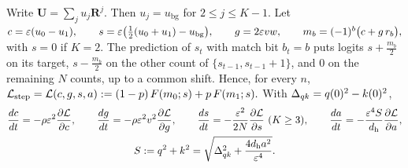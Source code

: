 \begin{lemma}
\label{lem:J-reduce}
Write $\mathbf U=\sum_ju_j\mathbf R^j$. Then $u_j=u_{\mathrm{bg}}$ for $2\le j\le K-1$. Let
 $c=\initscale(u_0-u_1),\qquad s=\initscale\bigl(\tfrac{1}{2}(u_0+u_1)-u_{\mathrm{bg}}\bigr),\qquad g=2\initscale vw,\qquad m_b=(-1)^b\bigl(c+g\,r_b\bigr),$ 
with $s=0$ if $K=2$. The prediction of $s_t$ with match bit $b_t=b$ puts logits $s+\frac{m_b}{2}$ on its target, $s-\frac{m_b}{2}$ on the other count of
$\{s_{t-1},s_{t-1}+1\}$, and $0$ on the remaining $N$ counts, up to a common shift. Hence, for every $n$,
 $\mathcal L_{\mathrm{step}}=\mathcal L(c,g,s,a):=(1-p)\,F(m_0;s)+p\,F(m_1;s).$ 
With $\Delta_{qk}=q(0)^2-k(0)^2$,
\begin{equation}
 \begin{gathered}
 \ddt{c}=-\rho\initscale^2\pd{\mathcal L}{c},\qquad \ddt{g}=-\rho\initscale^2v^2\pd{\mathcal L}{g},\qquad \ddt{s}=-\frac{\initscale^2}{2N}\pd{\mathcal L}{s}\ (K\ge3),\qquad \ddt{a}=-\frac{\initscale^4S}{d_{\mathrm h}}\pd{\mathcal L}{a},\\
 S:=q^2+k^2=\sqrt{\qkbalance^2+\frac{4d_{\mathrm h}a^2}{\initscale^4}}.
 \end{gathered}
 \label{eq:J-flow}
\end{equation}
\end{lemma}

